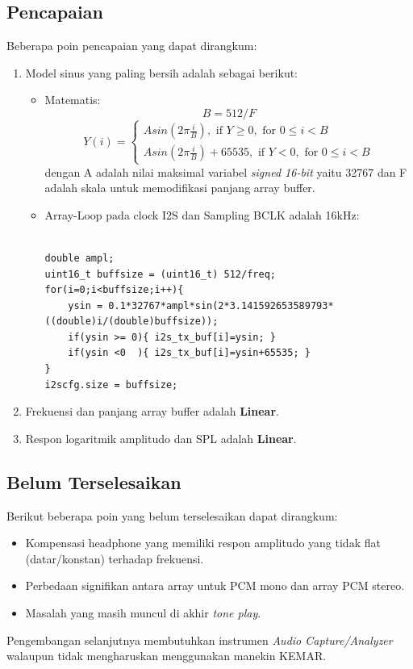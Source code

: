 \documentclass[12pt,]{article}
\begin{document}
	\subsection{Pencapaian}
	Beberapa poin pencapaian yang dapat dirangkum:
	\begin{enumerate}
		\item Model sinus yang paling bersih adalah sebagai berikut:
		\begin{itemize}
			\item Matematis:
			\[ B = 512/F \]
			\[
			Y(i) =
			\begin{cases}
			A sin(2 \pi \frac{i}{B}), \text{ if } Y \geq 0, \text{ for } 0 \leq i < B\\
			A sin(2 \pi \frac{i}{B})+65535, \text{ if } Y < 0, \text{ for } 0 \leq i < B
			\end{cases}
			\]
			dengan A adalah nilai maksimal variabel \textit{signed 16-bit} yaitu 32767
			dan F adalah skala untuk memodifikasi panjang array buffer.

			\item Array-Loop pada clock I2S dan Sampling BCLK adalah 16kHz:
			\begin{verbatim}

double ampl;
uint16_t buffsize = (uint16_t) 512/freq;
for(i=0;i<buffsize;i++){
	ysin = 0.1*32767*ampl*sin(2*3.141592653589793*((double)i/(double)buffsize));
	if(ysin >= 0){ i2s_tx_buf[i]=ysin; }
	if(ysin <0  ){ i2s_tx_buf[i]=ysin+65535; }
}
i2scfg.size = buffsize;
			\end{verbatim}
		\end{itemize}

		\item Frekuensi dan panjang array buffer adalah \textbf{Linear}.

		\item Respon logaritmik amplitudo dan SPL adalah \textbf{Linear}.
	\end{enumerate}

	\subsection{Belum Terselesaikan}
	Berikut beberapa poin yang belum terselesaikan dapat dirangkum:
	\begin{itemize}
		\item Kompensasi headphone yang memiliki respon amplitudo yang
		tidak flat (datar/konstan) terhadap frekuensi.

		\item Perbedaan signifikan antara array untuk PCM mono dan array PCM stereo.

		\item Masalah  yang masih muncul di akhir \textit{tone play}.
	\end{itemize}

	Pengembangan selanjutnya membutuhkan instrumen \textit{Audio Capture/Analyzer}
	walaupun tidak mengharuskan menggunakan manekin KEMAR.
\end{document}
